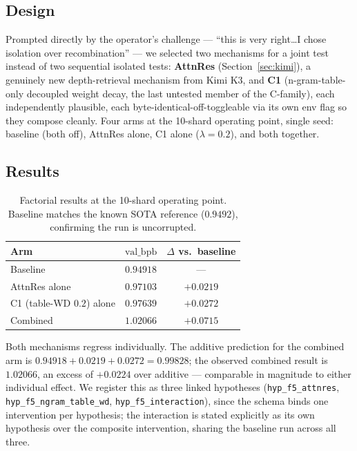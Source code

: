 \documentclass{article}
\newcommand{\valbpb}{\mathrm{val\_bpb}}
\begin{document}
\subsection{Design}
Prompted directly by the operator's challenge --- ``this is very right\ldots I chose isolation over recombination'' --- we selected two mechanisms for a joint test instead of two sequential isolated tests: \textbf{AttnRes} (Section~\ref{sec:kimi}), a genuinely new depth-retrieval mechanism from Kimi K3, and \textbf{C1} (n-gram-table-only decoupled weight decay, the last untested member of the C-family), each independently plausible, each byte-identical-off-toggleable via its own env flag so they compose cleanly. Four arms at the 10-shard operating point, single seed: baseline (both off), AttnRes alone, C1 alone ($\lambda=0.2$), and both together.

\subsection{Results}
\begin{table}[t]
\caption{Factorial results at the 10-shard operating point. Baseline matches the known SOTA reference ($0.9492$), confirming the run is uncorrupted.}
\label{tab:factorial}
\vskip 0.1in
\begin{center}\begin{small}\begin{tabular}{lcc}
\toprule
Arm & $\valbpb$ & $\Delta$ vs.\ baseline \\
\midrule
Baseline & $0.94918$ & --- \\
AttnRes alone & $0.97103$ & $+0.0219$ \\
C1 (table-WD $0.2$) alone & $0.97639$ & $+0.0272$ \\
Combined & $1.02066$ & $+0.0715$ \\
\bottomrule
\end{tabular}\end{small}\end{center}
\vskip -0.15in
\end{table}

Both mechanisms regress individually. The additive prediction for the combined arm is $0.94918 + 0.0219 + 0.0272 = 0.99828$; the observed combined result is $1.02066$, an excess of $+0.0224$ over additive --- comparable in magnitude to either individual effect. We register this as three linked hypotheses (\texttt{hyp\_f5\_attnres}, \texttt{hyp\_f5\_ngram\_table\_wd}, \texttt{hyp\_f5\_interaction}), since the schema binds one intervention per hypothesis; the interaction is stated explicitly as its own hypothesis over the composite intervention, sharing the baseline run across all three.
\end{document}

